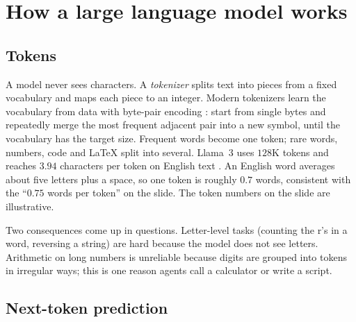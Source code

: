 \section{How a large language model works}\label{sec:llm}


\subsection{Tokens}

A model never sees characters. A \emph{tokenizer} splits text into pieces from a fixed
vocabulary and maps each piece to an integer. Modern tokenizers learn the vocabulary
from data with byte-pair encoding : start from single bytes and repeatedly
merge the most frequent adjacent pair into a new symbol, until the vocabulary has the
target size. Frequent words become one token; rare words, numbers, code and \LaTeX{}
split into several. Llama~3 uses $128$K tokens and reaches $3.94$ characters per token
on English text . An English word averages about five letters plus a space,
so one token is roughly $0.7$ words, consistent with the ``$0.75$ words per token'' on the
slide. The token numbers on the slide are illustrative.

Two consequences come up in questions. Letter-level tasks (counting the r's in a word,
reversing a string) are hard because the model does not see letters. Arithmetic on long
numbers is unreliable because digits are grouped into tokens in irregular ways; this is
one reason agents call a calculator or write a script.

\subsection{Next-token prediction}

